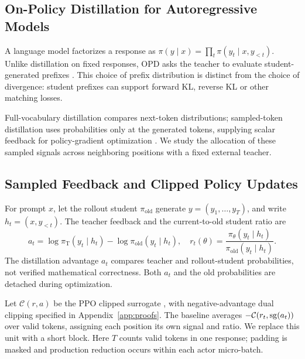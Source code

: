 \subsection{On-Policy Distillation for Autoregressive Models}
A language model factorizes a response as $\pi(y\mid x)=\prod_t\pi(y_t\mid x,y_{<t})$. Unlike distillation on fixed responses, OPD asks the teacher to evaluate student-generated prefixes \citep{dagger,gkd}. This choice of prefix distribution is distinct from the choice of divergence: student prefixes can support forward KL, reverse KL or other matching losses.

Full-vocabulary distillation compares next-token distributions; sampled-token distillation uses probabilities only at the generated tokens, supplying scalar feedback for policy-gradient optimization \citep{minillm,revisiting}. We study the allocation of these sampled signals across neighboring positions with a fixed external teacher.

\subsection{Sampled Feedback and Clipped Policy Updates}
For prompt $x$, let the rollout student $\pi_{\mathrm{old}}$ generate $y=(y_1,\ldots,y_T)$, and write $h_t=(x,y_{<t})$. The teacher feedback and the current-to-old student ratio are
\begin{equation}
 a_t=\log\pi_{\mathrm{T}}(y_t\mid h_t)-\log\pi_{\mathrm{old}}(y_t\mid h_t),
 \quad r_t(\theta)=\frac{\pi_\theta(y_t\mid h_t)}{\pi_{\mathrm{old}}(y_t\mid h_t)}.
 \label{eq:token}
\end{equation}
The distillation advantage $a_t$ compares teacher and rollout-student probabilities, not verified mathematical correctness. Both $a_t$ and the old probabilities are detached during optimization.

Let $\mathcal C(r,a)$ be the PPO clipped surrogate \citep{ppo}, with negative-advantage dual clipping specified in Appendix~\ref{app:proofs}. The baseline averages $-\mathcal C(r_t,\operatorname{sg}(a_t))$ over valid tokens, assigning each position its own signal and ratio. We replace this unit with a short block. Here $T$ counts valid tokens in one response; padding is masked and production reduction occurs within each actor micro-batch.
